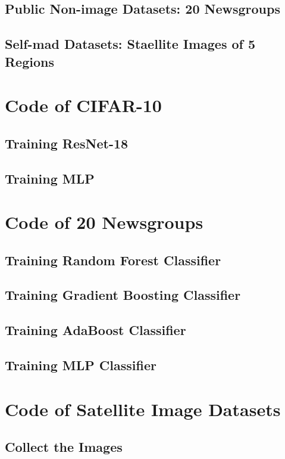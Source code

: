 \documentclass[twocolumn, draft]{extarticle}
\begin{document}
\begin{appendices}
\subsection{Public Non-image Datasets: 20 Newsgroups}

\subsection{Self-mad Datasets: Staellite Images of 5 Regions}

\section{Code of CIFAR-10}
\subsection{Training ResNet-18}
\subsection{Training MLP}
\section{Code of 20 Newsgroups}
\subsection{Training Random Forest Classifier}
\subsection{Training Gradient Boosting Classifier}
\subsection{Training AdaBoost Classifier}
\subsection{Training MLP Classifier}
\section{Code of Satellite Image Datasets}
\subsection{Collect the Images}
\end{appendices}
\end{document}
